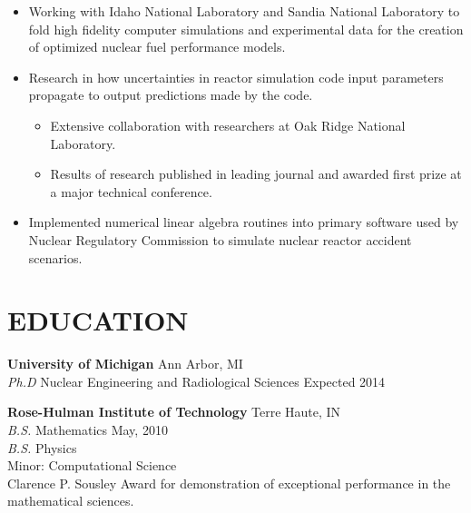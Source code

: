 \documentclass[margin, 10pt]{res} %
\begin{document}
\begin{resume}
\begin{itemize} \itemsep -2pt %
\item Working with Idaho National Laboratory and Sandia National Laboratory to fold high fidelity computer simulations and experimental data for the creation of optimized nuclear fuel performance models. 
\item Research in how uncertainties in reactor simulation code input parameters propagate to output predictions made by the code.
\begin{itemize}
\item Extensive collaboration with researchers at Oak Ridge National Laboratory.
\item Results of research published in leading journal and awarded first prize at a major technical conference.
\end{itemize}
\item Implemented numerical linear algebra routines into primary software used by Nuclear Regulatory Commission to simulate nuclear reactor accident scenarios.
\end{itemize}




\section{EDUCATION}

\textbf{University of Michigan} \hfill Ann Arbor, MI \\
{\sl Ph.D} Nuclear Engineering and Radiological Sciences \hfill Expected 2014

\textbf{Rose-Hulman Institute of Technology} \hfill Terre Haute, IN \\
{\sl B.S.} Mathematics \hfill May, 2010 \\
{\sl B.S.} Physics \\
Minor: Computational Science \\
Clarence P. Sousley Award for demonstration of exceptional performance in the mathematical sciences.
  
\end{resume}
\end{document}
